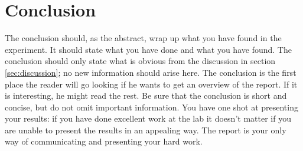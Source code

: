 \section{Conclusion}
\label{sec:conclusion}
The conclusion should, as the abstract, wrap up what you have found in the experiment. It should state what you have done and what you have found. The conclusion should only state what is obvious from the discussion in section \ref{sec:discussion}; no new information should arise here. The conclusion is the first place the reader will go looking if he wants to get an overview of the report. If it is interesting, he might read the rest. Be sure that the conclusion is short and concise, but do not omit important information. You have one shot at presenting your results: if you have done excellent work at the lab it doesn't matter if you are unable to present the results in an appealing way. The report is your only way of communicating and presenting your hard work.